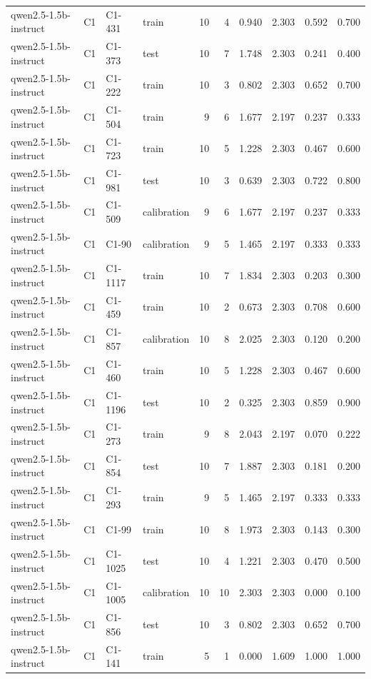 \begin{table}
\begin{tabular}{llllrrrrrr}
qwen2.5-1.5b-instruct & C1 & C1-431 & train & 10 & 4 & 0.940 & 2.303 & 0.592 & 0.700 \\
qwen2.5-1.5b-instruct & C1 & C1-373 & test & 10 & 7 & 1.748 & 2.303 & 0.241 & 0.400 \\
qwen2.5-1.5b-instruct & C1 & C1-222 & train & 10 & 3 & 0.802 & 2.303 & 0.652 & 0.700 \\
qwen2.5-1.5b-instruct & C1 & C1-504 & train & 9 & 6 & 1.677 & 2.197 & 0.237 & 0.333 \\
qwen2.5-1.5b-instruct & C1 & C1-723 & train & 10 & 5 & 1.228 & 2.303 & 0.467 & 0.600 \\
qwen2.5-1.5b-instruct & C1 & C1-981 & test & 10 & 3 & 0.639 & 2.303 & 0.722 & 0.800 \\
qwen2.5-1.5b-instruct & C1 & C1-509 & calibration & 9 & 6 & 1.677 & 2.197 & 0.237 & 0.333 \\
qwen2.5-1.5b-instruct & C1 & C1-90 & calibration & 9 & 5 & 1.465 & 2.197 & 0.333 & 0.333 \\
qwen2.5-1.5b-instruct & C1 & C1-1117 & train & 10 & 7 & 1.834 & 2.303 & 0.203 & 0.300 \\
qwen2.5-1.5b-instruct & C1 & C1-459 & train & 10 & 2 & 0.673 & 2.303 & 0.708 & 0.600 \\
qwen2.5-1.5b-instruct & C1 & C1-857 & calibration & 10 & 8 & 2.025 & 2.303 & 0.120 & 0.200 \\
qwen2.5-1.5b-instruct & C1 & C1-460 & train & 10 & 5 & 1.228 & 2.303 & 0.467 & 0.600 \\
qwen2.5-1.5b-instruct & C1 & C1-1196 & test & 10 & 2 & 0.325 & 2.303 & 0.859 & 0.900 \\
qwen2.5-1.5b-instruct & C1 & C1-273 & train & 9 & 8 & 2.043 & 2.197 & 0.070 & 0.222 \\
qwen2.5-1.5b-instruct & C1 & C1-854 & test & 10 & 7 & 1.887 & 2.303 & 0.181 & 0.200 \\
qwen2.5-1.5b-instruct & C1 & C1-293 & train & 9 & 5 & 1.465 & 2.197 & 0.333 & 0.333 \\
qwen2.5-1.5b-instruct & C1 & C1-99 & train & 10 & 8 & 1.973 & 2.303 & 0.143 & 0.300 \\
qwen2.5-1.5b-instruct & C1 & C1-1025 & test & 10 & 4 & 1.221 & 2.303 & 0.470 & 0.500 \\
qwen2.5-1.5b-instruct & C1 & C1-1005 & calibration & 10 & 10 & 2.303 & 2.303 & 0.000 & 0.100 \\
qwen2.5-1.5b-instruct & C1 & C1-856 & test & 10 & 3 & 0.802 & 2.303 & 0.652 & 0.700 \\
qwen2.5-1.5b-instruct & C1 & C1-141 & train & 5 & 1 & 0.000 & 1.609 & 1.000 & 1.000 \\

\end{tabular}
\end{table}
